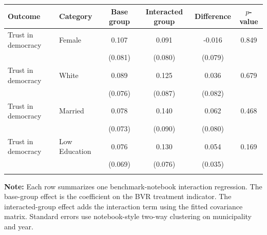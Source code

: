 \begin{tabular*}{\textwidth}{@{\extracolsep{\fill}}llcccc}
\doubletoprule
Outcome & Category & Base group & Interacted group & Difference & $p$-value \\
\midrule
Trust in democracy & Female & 0.107 & 0.091 & -0.016 & 0.849 \\
 &  & (0.081) & (0.080) & (0.079) & \\
Trust in democracy & White & 0.089 & 0.125 & 0.036 & 0.679 \\
 &  & (0.076) & (0.087) & (0.082) & \\
Trust in democracy & Married & 0.078 & 0.140 & 0.062 & 0.468 \\
 &  & (0.073) & (0.090) & (0.080) & \\
Trust in democracy & Low Education & 0.076 & 0.130 & 0.054 & 0.169 \\
 &  & (0.069) & (0.076) & (0.035) & \\
\doublebottomrule
\end{tabular*}

\begin{minipage}{\textwidth}
\footnotesize
\textbf{Note:} Each row summarizes one benchmark-notebook interaction regression. The base-group effect is the coefficient on the BVR treatment indicator. The interacted-group effect adds the interaction term using the fitted covariance matrix. Standard errors use notebook-style two-way clustering on municipality and year.
\end{minipage}
